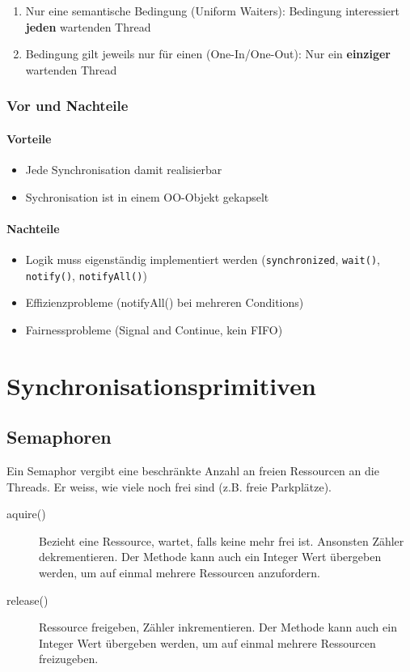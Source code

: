 \begin{enumerate}
	\item Nur eine semantische Bedingung (Uniform Waiters): Bedingung interessiert \textbf{jeden} wartenden Thread
	\item Bedingung gilt jeweils nur für einen (One-In/One-Out): Nur ein \textbf{einziger} wartenden Thread
\end{enumerate}

\subsubsection{Vor und Nachteile}
\paragraph{Vorteile}
\begin{itemize}
	\item Jede Synchronisation damit realisierbar
	\item Sychronisation ist in einem OO-Objekt gekapselt
\end{itemize}

\paragraph{Nachteile}
\begin{itemize}
	\item Logik muss eigenständig implementiert werden (\lstinline|synchronized|, \lstinline|wait()|, \lstinline|notify()|, \lstinline|notifyAll()|)
	\item Effizienzprobleme (notifyAll() bei mehreren Conditions)
	\item Fairnessprobleme (Signal and Continue, kein FIFO)
\end{itemize}



\section{Synchronisationsprimitiven}

\subsection{Semaphoren}

Ein Semaphor vergibt eine beschränkte Anzahl an freien Ressourcen an die Threads. Er weiss, wie viele noch frei sind (z.B. freie Parkplätze). 

\begin{description}
	\item[aquire()] Bezieht eine Ressource, wartet, falls keine mehr frei ist. Ansonsten Zähler dekrementieren. Der Methode kann auch ein Integer Wert übergeben werden, um auf einmal mehrere Ressourcen anzufordern.
	\item[release()] Ressource freigeben, Zähler inkrementieren. Der Methode kann auch ein Integer Wert übergeben werden, um auf einmal mehrere Ressourcen freizugeben.
\end{description}

